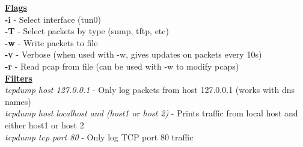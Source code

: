 \documentclass[a4paper,10pt]{article}
\begin{document}
\begin{tcolorbox}[breakable,title=tcpdump]
\underline{\textbf{Flags}}\\
\newline
\textbf{-i} - Select interface (tun0)\\
\textbf{-T} - Select packets by type (snmp, tftp, etc)\\
\textbf{-w} - Write packets to file\\
\textbf{-v} - Verbose (when used with -w, gives updates on packets every 10s)\\
\textbf{-r} - Read pcap from file (can be used with -w to modify pcaps)\\
\underline{\textbf{Filters}}\\
\textit{tcpdump host 127.0.0.1} - Only log packets from host 127.0.0.1 (works with dns names)\\
\textit{tcpdump host localhost and (host1 or host 2)} - Prints traffic from local host and either host1 or host 2\\
\textit{tcpdump tcp port 80} - Only log TCP port 80 traffic
\end{tcolorbox}
\newpage
\begin{tcolorbox}[height=\textheight,width=\linewidth,title=Notes]
\end{tcolorbox}
\end{document}
